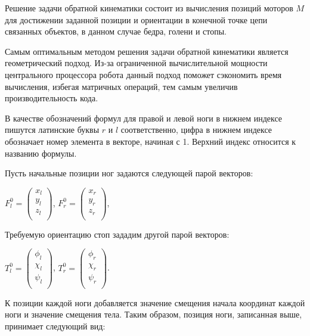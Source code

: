Решение задачи обратной кинематики состоит из вычисления позиций моторов $M$ для достижении заданной позиции и ориентации в конечной точке цепи связанных объектов, в данном случае бедра, голени и стопы.

Самым оптимальным методом решения задачи обратной кинематики является геометрический подход\cite{spong2008robot}. Из-за ограниченной вычислительной мощности центрального процессора робота данный подход поможет сэкономить время вычисления, избегая матричных операций, тем самым увеличив производительность кода.

В качестве обозначений формул для правой и левой ноги в нижнем индексе пишутся латинские буквы $r$ и $l$ соответственно, цифра в нижнем индексе обозначает номер элемента в векторе, начиная с 1. Верхний индекс относится к названию формулы.

Пусть начальные позиции ног задаются следующей парой векторов:

\begin{center}
$F^{0}_{l} = \begin{pmatrix}
x_l \\
y_l \\
z_l \\
\end{pmatrix}$,
$F^{0}_{r} = \begin{pmatrix}
x_r \\
y_r \\
z_r \\
\end{pmatrix}$,
\end{center}

Требуемую ориентацию стоп зададим другой парой векторов:

\begin{center}
$T^{0}_{l} = \begin{pmatrix}
\phi_l \\
\chi_l \\
\psi_l \\
\end{pmatrix}$,
$T^{0}_{r} = \begin{pmatrix}
\phi_r \\
\chi_r \\
\psi_r \\
\end{pmatrix}$.
\end{center}

К позиции каждой ноги добавляется значение смещения начала координат каждой ноги и значение смещения тела.  Таким образом, позиция ноги, записанная выше, принимает следующий вид:


